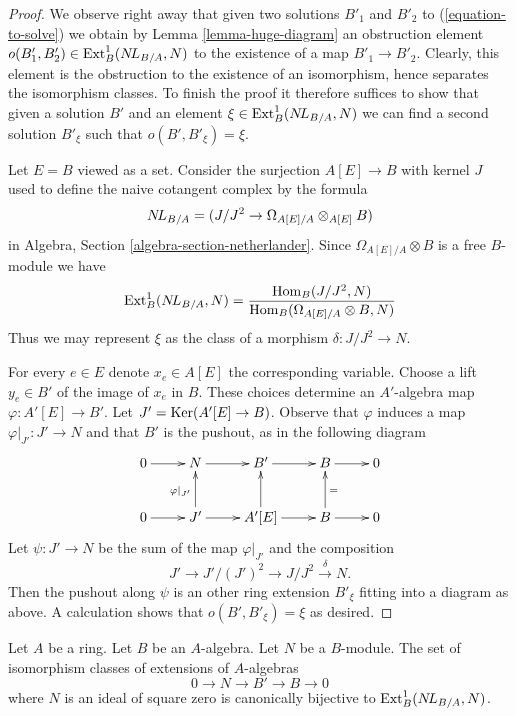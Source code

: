 \begin{proof}
We observe right away that given two solutions $B'_1$ and $B'_2$
to (\ref{equation-to-solve}) we obtain by Lemma \ref{lemma-huge-diagram} an
obstruction element $o(B'_1, B'_2) \in \mathop{\mathrm{Ext}}\nolimits^1_B(\mathop{N\!L}\nolimits_{B/A}, N)$
to the existence of a map $B'_1 \to B'_2$. Clearly, this element
is the obstruction to the existence of an isomorphism, hence separates
the isomorphism classes. To finish the proof it therefore suffices to
show that given a solution $B'$ and an element
$\xi \in \mathop{\mathrm{Ext}}\nolimits^1_B(\mathop{N\!L}\nolimits_{B/A}, N)$
we can find a second solution $B'_\xi$ such that
$o(B', B'_\xi) = \xi$.

\medskip\noindent
Let $E = B$ viewed as a set. Consider the surjection $A[E] \to B$ with kernel
$J$ used to define the naive cotangent complex by the formula
$$
\mathop{N\!L}\nolimits_{B/A} = (J/J^2 \to \Omega_{A[E]/A} \otimes_{A[E]} B)
$$
in Algebra, Section \ref{algebra-section-netherlander}.
Since $\Omega_{A[E]/A} \otimes B$ is a free $B$-module we have
$$
\mathop{\mathrm{Ext}}\nolimits^1_B(\mathop{N\!L}\nolimits_{B/A}, N) =
\frac{\mathop{\mathrm{Hom}}\nolimits_B(J/J^2, N)}
{\mathop{\mathrm{Hom}}\nolimits_B(\Omega_{A[E]/A} \otimes B, N)}
$$
Thus we may represent $\xi$ as the class of a morphism $\delta : J/J^2 \to N$.

\medskip\noindent
For every $e \in E$ denote $x_e \in A[E]$ the corresponding variable.
Choose a lift $y_e \in B'$ of the image of $x_e$ in $B$.
These choices determine an $A'$-algebra map $\varphi : A'[E] \to B'$.
Let $J' = \mathop{\mathrm{Ker}}(A'[E] \to B)$. Observe that $\varphi$ induces a map
$\varphi|_{J'} : J' \to N$ and that $B'$ is the pushout, as in the following
diagram
$$
\xymatrix{
0 \ar[r] & N \ar[r] & B' \ar[r] & B \ar[r] & 0 \\
0 \ar[r] & J' \ar[u]^{\varphi|_{J'}} \ar[r] & A'[E] \ar[u] \ar[r] &
B \ar[u]_{=} \ar[r] & 0
}
$$
Let $\psi : J' \to N$ be the sum of the map $\varphi|_{J'}$ and the
composition
$$
J' \to J'/(J')^2 \to J/J^2 \xrightarrow{\delta} N.
$$
Then the pushout along $\psi$ is an other ring extension $B'_\xi$
fitting into a diagram as above. A calculation shows that
$o(B', B'_\xi) = \xi$ as desired.
\end{proof}

\begin{lemma}
\label{lemma-extensions-of-algebras}
Let $A$ be a ring. Let $B$ be an $A$-algebra. Let $N$ be a $B$-module.
The set of isomorphism classes of extensions of $A$-algebras
$$
0 \to N \to B' \to B \to 0
$$
where $N$ is an ideal of square zero is canonically bijective to
$\mathop{\mathrm{Ext}}\nolimits^1_B(\mathop{N\!L}\nolimits_{B/A}, N)$.
\end{lemma}


